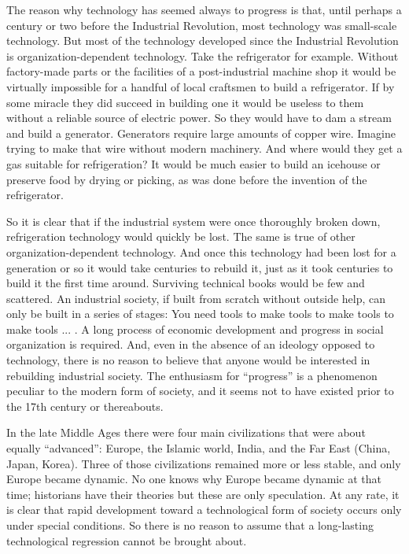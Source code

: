  The reason why technology has seemed always to progress is that, until perhaps a century or two before the Industrial Revolution, most technology was small-scale technology. But most of the technology developed since the Industrial Revolution is organization-dependent technology. Take the refrigerator for example. Without factory-made parts or the facilities of a post-industrial machine shop it would be virtually impossible for a handful of local craftsmen to build a refrigerator. If by some miracle they did succeed in building one it would be useless to them without a reliable source of electric power. So they would have to dam a stream and build a generator. Generators require large amounts of copper wire. Imagine trying to make that wire without modern machinery. And where would they get a gas suitable for refrigeration? It would be much easier to build an icehouse or preserve food by drying or picking, as was done before the invention of the refrigerator.

 So it is clear that if the industrial system were once thoroughly broken down, refrigeration technology would quickly be lost. The same is true of other organization-dependent technology. And once this technology had been lost for a generation or so it would take centuries to rebuild it, just as it took centuries to build it the first time around. Surviving technical books would be few and scattered. An industrial society, if built from scratch without outside help, can only be built in a series of stages: You need tools to make tools to make tools to make tools ... . A long process of economic development and progress in social organization is required. And, even in the absence of an ideology opposed to technology, there is no reason to believe that anyone would be interested in rebuilding industrial society. The enthusiasm for “progress” is a phenomenon peculiar to the modern form of society, and it seems not to have existed prior to the 17th century or thereabouts.

 In the late Middle Ages there were four main civilizations that were about equally “advanced”: Europe, the Islamic world, India, and the Far East (China, Japan, Korea). Three of those civilizations remained more or less stable, and only Europe became dynamic. No one knows why Europe became dynamic at that time; historians have their theories but these are only speculation. At any rate, it is clear that rapid development toward a technological form of society occurs only under special conditions. So there is no reason to assume that a long-lasting technological regression cannot be brought about.

